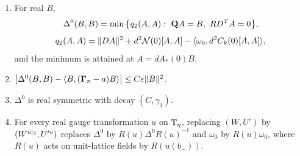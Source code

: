 \begin{proposition}\label{prop:hessian}
\begin{enumerate}[label=(\alph*)]
\item For real $B$,
\[
\Delta^0(B,B)=\min\big\{q_2(A,A):\ \mathbf Q A=B,\ RD^TA=0\big\},
\]
\[
q_2(A,A)=\|DA\|^2+d^2\mathcal N(0)[A,A]-\langle \omega_0,d^2C_k(0)[A,A]\rangle,
\]
and the minimum is attained at $A=dA_*(0)B$.
\item $\big|\Delta^0(B,B)-\langle B,(\boldsymbol\Gamma_\pi-a)B\rangle\big|\le C\varepsilon\|B\|^2$.
\item $\Delta^0$ is real symmetric with decay $(C,\gamma_1)$.
\item For every real gauge transformation $u$ on $\mathbb T_\eta$, replacing $(W,U')$ by $(W^{u|_\mathbb T},U'^u)$ replaces $\Delta^0$ by $R(u)\Delta^0R(u)^{-1}$ and $\omega_0$ by $R(u)\omega_0$, where $R(u)$ acts on unit-lattice fields by $R(u(b_-))$.
\end{enumerate}
\end{proposition}

